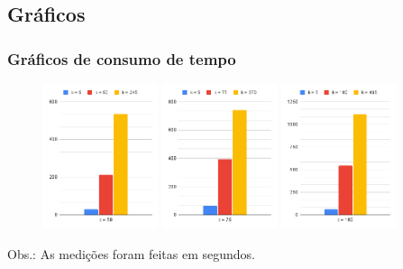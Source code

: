 \documentclass{beamer}
\begin{document}
\subsection{Gráficos}
\begin{frame}
  \frametitle{Gráficos de consumo de tempo}
  \begin{figure}
    \centering
    \includegraphics[width=0.3\textwidth]{t_d_peq.png}
    \includegraphics[width=0.3\textwidth]{t_d_med.png}
    \includegraphics[width=0.3\textwidth]{t_d_gra.png}
  \end{figure}
  Obs.: As medições foram feitas em segundos.
\end{frame}

\end{document}
